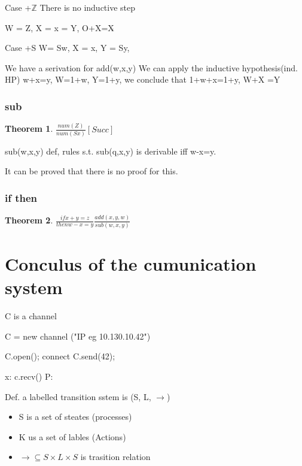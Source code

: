\documentclass[a4paper,10pt,titlepage]{report}
\newtheorem{theorem}{Theorem}
\newcommand{\Z}{\mathbb{Z}}
\begin{document}
Case +$\Z$
There is no inductive step

W = Z, X = x = Y, O+X=X$ \check{}$

Case +S W= Sw, X = x, Y = Sy,

We have a serivation for add(w,x,y)
We can apply the inductive hypothesis(ind. HP)
w+x=y, W=1+w, Y=1+y, we conclude that 1+w+x=1+y, W+X =Y


\subsubsection{sub}
\begin{theorem}

$\frac{num(Z)}{num(Sx)}[Succ]$

\end{theorem}

sub(w,x,y) def, rules s.t. sub(q,x,y) is derivable iff w-x=y.

It can be proved that there is no proof for this.



\subsubsection{if then}

\begin{theorem}

$\frac{if x+y=z}{then w-x=y}\frac{add(x,y,w)}{sub(w,x,y)}$

\end{theorem}

\newpage

\section{Conculus of the cumunication system}

C is a channel

C = new channel ("IP eg 10.130.10.42")

C.open(); connect
C.send(42);

x: c.recv()
P:


Def. a labelled transition sstem is (S, L, $\rightarrow$)
\begin{itemize}
\item S is a set of steates (processes)
\item K us a set of lables (Actions)
\item $\rightarrow \subseteq S\times L\times S $ is trasition relation 
\end{itemize}
\end{document}

